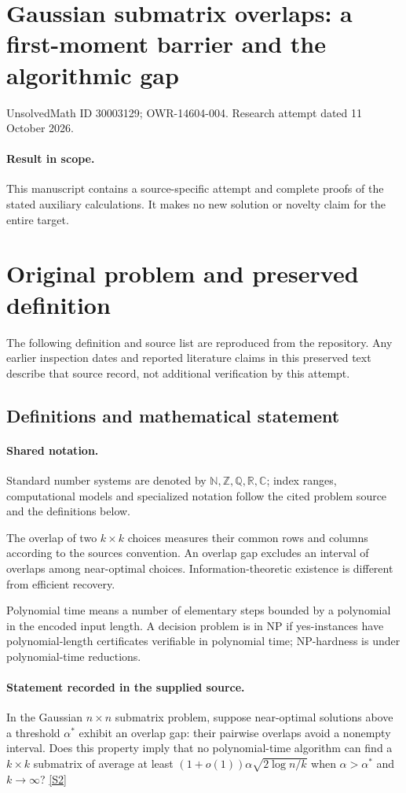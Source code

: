 \documentclass[11pt]{article}
\begin{document}
\section*{Gaussian submatrix overlaps: a first-moment barrier and the algorithmic gap}
\noindent UnsolvedMath ID 30003129; OWR-14604-004. Research attempt dated 11 October 2026.
\paragraph{Result in scope.}This manuscript contains a source-specific attempt and complete proofs of the stated auxiliary calculations. It makes no new solution or novelty claim for the entire target.
\section{Original problem and preserved definition}
The following definition and source list are reproduced from the repository. Any earlier inspection dates and reported literature claims in this preserved text describe that source record, not additional verification by this attempt.
\subsection{Definitions and mathematical statement}

\paragraph{Shared notation.}Standard number systems are denoted by $\mathbb N,\mathbb Z,\mathbb Q,\mathbb R,\mathbb C$; index ranges, computational models and specialized notation follow the cited problem source and the definitions below.


The overlap of two $k\times k$ choices measures their common rows and columns according to the source\textquotesingle s convention. An overlap gap excludes an interval of overlaps among near-optimal choices. Information-theoretic existence is different from efficient recovery.

Polynomial time means a number of elementary steps bounded by a polynomial in the encoded input length. A decision problem is in $\mathrm{NP}$ if yes-instances have polynomial-length certificates verifiable in polynomial time; NP-hardness is under polynomial-time reductions.
\paragraph{Statement recorded in the supplied source.}
In the Gaussian $n\times n$ submatrix problem, suppose near-optimal solutions above a threshold $\alpha^*$ exhibit an overlap gap: their pairwise overlaps avoid a nonempty interval. Does this property imply that no polynomial-time algorithm can find a $k\times k$ submatrix of average at least $(1+o(1))\alpha\sqrt{2\log n/k}$ when $\alpha>\alpha^*$ and $k\to\infty$? \href{https://doi.org/10.4171/owr/2016/22}{[S2]}
\end{document}
